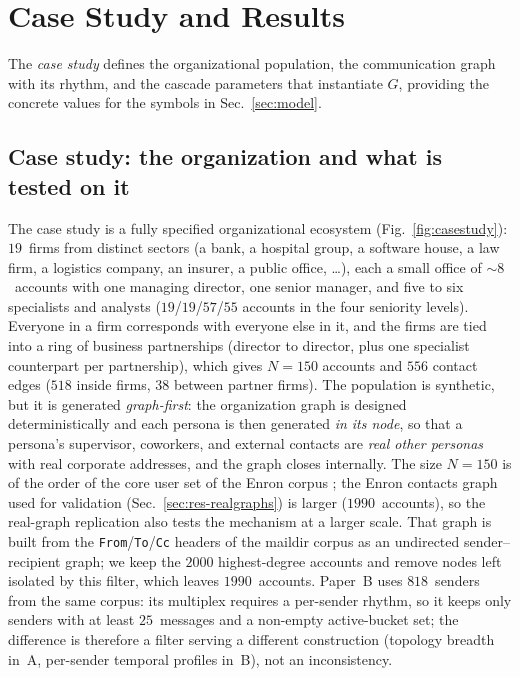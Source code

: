 \section{Case Study and Results}
\label{sec:results}

The \emph{case study} defines the organizational population, the communication graph with its rhythm, and the
cascade parameters that instantiate $G$, providing the concrete values for the symbols in
Sec.~\ref{sec:model}.

\subsection{Case study: the organization and what is tested on it}
\label{sec:cs-setup}
The case study is a fully specified organizational ecosystem (Fig.~\ref{fig:casestudy}): $19$~firms from
distinct sectors (a bank, a hospital group, a software house, a law firm, a logistics company, an insurer,
a public office, \dots), each a small office of $\sim\!8$~accounts with one managing director, one senior
manager, and five to six specialists and analysts ($19$/$19$/$57$/$55$ accounts in the four seniority
levels). Everyone in a firm corresponds with everyone else in it, and the firms are tied into a ring of
business partnerships (director to director, plus one specialist counterpart per partnership), which gives
$N{=}150$ accounts and $556$ contact edges ($518$ inside firms, $38$ between partner firms). The population is
synthetic, but it is generated \emph{graph-first}: the organization graph is designed deterministically and
each persona is then generated \emph{in its node}, so that a persona's supervisor, coworkers, and external
contacts are \emph{real other personas} with real corporate addresses, and the graph closes internally. The
size $N{=}150$ is of the order of the core user set of the Enron corpus \citep{klimt2004enron}; the Enron
contacts graph used for validation (Sec.~\ref{sec:res-realgraphs}) is larger ($1990$~accounts), so the
real-graph replication also tests the mechanism at a larger scale. That graph is built from the
\texttt{From}/\texttt{To}/\texttt{Cc} headers of the maildir corpus as an undirected sender--recipient graph;
we keep the $2000$ highest-degree accounts and remove nodes left isolated by this filter, which leaves
$1990$~accounts. Paper~B uses $818$~senders from the same corpus: its multiplex requires a per-sender
rhythm, so it keeps only senders with at least $25$~messages and a non-empty active-bucket set; the
difference is therefore a filter serving a different construction (topology breadth in~A, per-sender
temporal profiles in~B), not an inconsistency.

